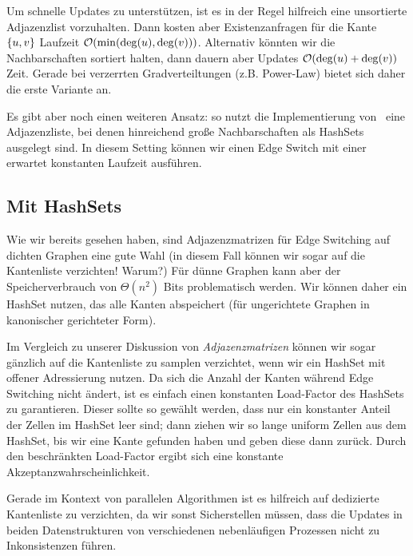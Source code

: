 Um schnelle Updates zu unterstützen, ist es in der Regel hilfreich eine unsortierte Adjazenzlist vorzuhalten.
Dann kosten aber Existenzanfragen für die Kante $\left\{u,v\right\}$ Laufzeit $\mathcal{O}\!\left(\min(\deg(u), \deg(v))\right)$.
Alternativ könnten wir die Nachbarschaften sortiert halten, dann dauern aber Updates $\mathcal{O}\!\left(\deg(u) + \deg(v)\right)$ Zeit.
Gerade bei verzerrten Gradverteiltungen (z.B. Power-Law) bietet sich daher die erste Variante an.

Es gibt aber noch einen weiteren Ansatz: so nutzt die Implementierung von~\cite{DBLP:journals/compnet/VigerL16} eine Adjazenzliste, bei denen hinreichend große Nachbarschaften als HashSets ausgelegt sind.
In diesem Setting können wir einen Edge Switch mit einer erwartet konstanten Laufzeit ausführen.

\subsection{Mit HashSets}
Wie wir bereits gesehen haben, sind Adjazenzmatrizen für Edge Switching auf dichten Graphen eine gute Wahl (in diesem Fall können wir sogar auf die Kantenliste verzichten! Warum?)
Für dünne Graphen kann aber der Speicherverbrauch von $\Theta(n^2)$ Bits problematisch werden.
Wir können daher ein HashSet nutzen, das alle Kanten abspeichert (für ungerichtete Graphen in kanonischer gerichteter Form).

Im Vergleich zu unserer Diskussion von \emph{Adjazenzmatrizen} können wir sogar gänzlich auf die Kantenliste zu samplen verzichtet, wenn wir ein HashSet mit offener Adressierung nutzen.
Da sich die Anzahl der Kanten während Edge Switching nicht ändert, ist es einfach einen konstanten Load-Factor des HashSets zu garantieren.
Dieser sollte so gewählt werden, dass nur ein konstanter Anteil der Zellen im HashSet leer sind;
dann ziehen wir so lange uniform Zellen aus dem HashSet, bis wir eine Kante gefunden haben und geben diese dann zurück.
Durch den beschränkten Load-Factor ergibt sich eine konstante Akzeptanzwahrscheinlichkeit.

Gerade im Kontext von parallelen Algorithmen ist es hilfreich auf dedizierte Kantenliste zu verzichten, da wir sonst Sicherstellen müssen, dass die Updates in beiden Datenstrukturen von verschiedenen nebenläufigen Prozessen nicht zu Inkonsistenzen führen.



